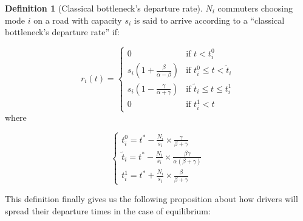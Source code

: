\documentclass[english, a4paper]{article}
\theoremstyle{plain}
\theoremstyle{definition}
\newtheorem{definition}{Definition}
\theoremstyle{remark}
\begin{document}
\begin{definition}[Classical bottleneck’s departure rate]
    $N_i$ commuters choosing mode $i$ on a road with capacity $s_i$ is said to arrive according to a ``classical bottleneck’s departure rate'' if:

    \begin{equation}
        r_i(t) = \left\{
        \begin{array}{lr}
            0 & \text{if } t<t_i^0\\
            s_i\left( 1 + \frac{\beta}{\alpha - \beta} \right) & \text{if } t_i^0 \leq t < \tilde{t}_i\\
            s_i\left( 1 - \frac{\gamma}{\alpha + \gamma} \right) & \text{if } \tilde{t}_i \leq t \leq t_i^1\\
            0 & \text{if } t_i^1 < t
        \end{array}
        \right.
        \end{equation}
        where
        
        \begin{equation}
        \left\{
        \begin{array}{l}
            t_i^0 = t^* - \frac{N_i}{s_i} \times \frac{\gamma}{\beta + \gamma}\\
            \tilde{t}_i = t^* - \frac{N_i}{s_i} \times \frac{\beta \gamma}{\alpha(\beta + \gamma)}\\
            t_i^1 = t^* + \frac{N_i}{s_i} \times \frac{\beta}{\beta + \gamma}
        \end{array}
        \right.
    \end{equation}
\end{definition}

This definition finally gives us the following proposition about how drivers will spread their departure times in the case of equilibrium:
\end{document}
